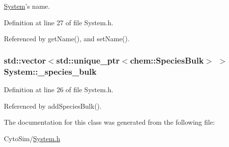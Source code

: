 \hyperlink{classSystem}{System}'s name. 



Definition at line 27 of file System.\-h.



Referenced by get\-Name(), and set\-Name().

\hypertarget{classSystem_a58cada67a766fc38e52ed4abfd373486}{
\subsubsection[{\-\_\-species\-\_\-bulk}]{\setlength{\rightskip}{0pt plus 5cm}std\-::vector$<$std\-::unique\-\_\-ptr$<${\bf chem\-::\-Species\-Bulk}$>$ $>$ {\bf System\-::\-\_\-species\-\_\-bulk}}}\label{classSystem_a58cada67a766fc38e52ed4abfd373486}


Definition at line 26 of file System.\-h.



Referenced by add\-Species\-Bulk().



The documentation for this class was generated from the following file\-:\begin{DoxyCompactItemize}
\item 
Cyto\-Sim/\hyperlink{System_8h}{System.\-h}\end{DoxyCompactItemize}
